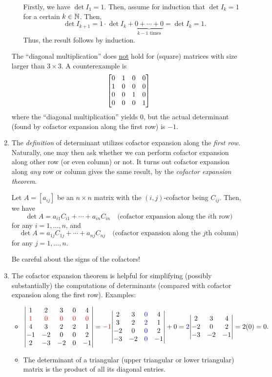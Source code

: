 \begin{enumerate}
\begin{itemize}
\begin{pf}
Firstly, we have \(\det I_1=1\). Then, assume for induction that \(\det I_k=1\)
for a certain \(k\in\mathbb{N}\). Then,
\[
\det I_{k+1}=1\cdot \det I_k+\underbrace{0+\dotsb+0}_{\text{\(k-1\) times}}
=\det I_k=1.
\]
Thus, the result follows by induction.
\end{pf}
\end{itemize}
\begin{warning}
The ``diagonal multiplication'' does \underline{not} hold for (square) matrices
with size larger than \(3\times  3\). A counterexample is
\[
\mqty[0&1&0&0\\ 1&0&0&0\\ 0&0&1&0\\ 0&0&0&1]
\]
where the ``diagonal multiplication'' yields \(0\), but the actual determinant
(found by cofactor expansion along the first row) is \(-1\).
\end{warning}
\item The \emph{definition} of determinant utilizes cofactor expansion along
the \emph{first row}. Naturally, one may then ask whether we can perform
cofactor expansion along other row (or even column) or not. It turns out
cofactor expansion along \emph{any} row or column gives the same result, by the
\emph{cofactor expansion theorem}.

\begin{theorem}
\label{thm:cofactor-expansion}
Let \(A=[a_{ij}]\) be an \(n\times n\) matrix with the \((i,j)\)-cofactor being
\(C_{ij}\). Then, we have
\[
\det A=a_{i1}C_{i1}+\dotsb+a_{in}C_{in}\quad\text{(cofactor expansion along the \(i\)th row)}
\]
for any \(i=1,\dotsc,n\), and
\[
\det A=a_{1j}C_{1j}+\dotsb+a_{nj}C_{nj}\quad\text{(cofactor expansion along the \(j\)th column)}
\]
for any \(j=1,\dotsc,n\).
\end{theorem}
\begin{warning}
Be careful about the signs of the cofactors!
\end{warning}

\item The cofactor expansion theorem is helpful for simplifying (possibly
substantially) the computations of determinants (compared with cofactor
expansion along the first row). Examples:
\begin{itemize}
\item \(\displaystyle 
\mqty|
1&2&3&0&4\\
\rc{1}&\rc{0}&\rc{0}&\rc{0}&\rc{0}\\
4&3&2&2&1\\
-1&-2&0&0&2\\
2&-3&-2&0&-1
|
=\vc{-}\rc{1}\mqty|
2&3&\blc{0}&4\\
3&2&\blc{2}&1\\
-2&0&\blc{0}&2\\
-3&-2&\blc{0}&-1
|+0
=
\blc{2}\mqty|
2&3&4\\
-2&0&2\\
-3&-2&-1
|
=2(0)
=0.
\)
\item The determinant of a triangular (upper triangular or lower triangular)
matrix is the product of all its diagonal entries.


\end{itemize}
\end{enumerate}
